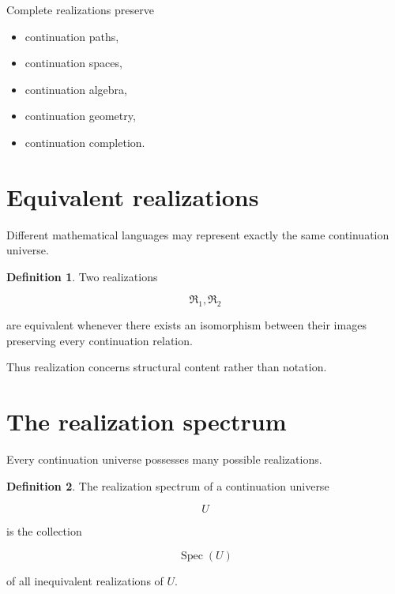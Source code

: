 \documentclass[13pt,openany]{book}
\theoremstyle{plain}
\theoremstyle{definition}
\newtheorem{definition}{Definition}[chapter]
\begin{document}
Complete realizations preserve

\begin{itemize}

\item continuation paths,

\item continuation spaces,

\item continuation algebra,

\item continuation geometry,

\item continuation completion.

\end{itemize}


\section{Equivalent realizations}

Different mathematical languages may represent exactly the same continuation universe.

\begin{definition}

Two realizations

\[
\mathfrak R_1,
\mathfrak R_2
\]

are equivalent whenever there exists an isomorphism between their images preserving every continuation relation.

\end{definition}

Thus realization concerns structural content rather than notation.


\section{The realization spectrum}

Every continuation universe possesses many possible realizations.

\begin{definition}

The realization spectrum of a continuation universe

\[
U
\]

is the collection

\[
\operatorname{Spec}(U)
\]

of all inequivalent realizations of $U$.

\end{definition}
\end{document}
